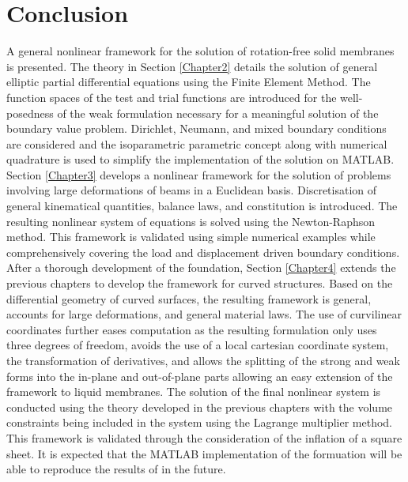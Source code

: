 \chapter{Conclusion}
\label{Chapter5}

A general nonlinear framework for the solution of rotation-free solid membranes is presented. The theory in Section \ref{Chapter2} details
 the solution of general elliptic partial differential equations using the Finite Element Method. The function spaces of the test
 and trial functions are introduced for the well-posedness of the weak formulation necessary for a meaningful solution of the
 boundary value problem. Dirichlet, Neumann, and mixed boundary conditions are considered and the isoparametric parametric concept
 along with numerical quadrature is used to simplify the implementation of the solution on MATLAB. Section \ref{Chapter3} develops a
 nonlinear framework for the solution of problems involving large deformations of beams in a Euclidean basis. Discretisation of
 general kinematical quantities, balance laws, and constitution is introduced. The resulting nonlinear system of equations is solved using the Newton-Raphson method. 
 This framework is validated using simple numerical examples while comprehensively covering the load and displacement driven boundary conditions. 
 After a thorough development of the foundation, Section \ref{Chapter4} extends the previous chapters to develop the framework for curved structures.
 Based on the differential geometry of curved surfaces, the resulting framework is general, accounts for large deformations, and general material laws.
 The use of curvilinear coordinates further eases computation as the resulting formulation only uses three degrees of freedom, avoids the use
 of a local cartesian coordinate system, the transformation of derivatives, and allows the splitting of the strong and weak forms
 into the in-plane and out-of-plane parts allowing an easy extension of the framework to liquid membranes. The solution of the final nonlinear system
 is conducted using the theory developed in the previous chapters with the volume constraints being included in the system using
 the Lagrange multiplier method. This framework is validated through the consideration of the inflation of a square sheet. It is expected
 that the MATLAB implementation of the formuation will be able to reproduce the results of \cite{sauer2014} in the future. 
